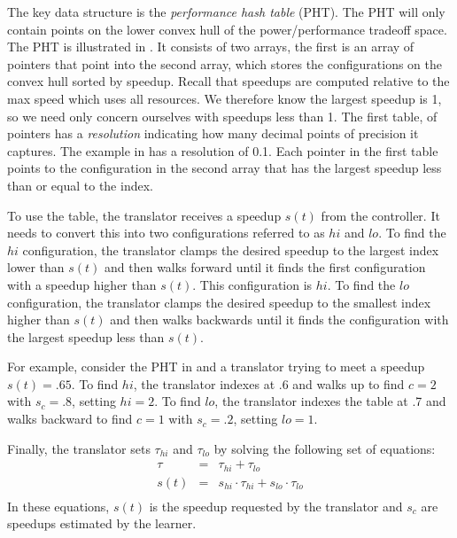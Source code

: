 The key data structure is the \emph{performance hash table} (PHT).
The PHT will only contain points on the lower convex hull of the
power/performance tradeoff space.  The PHT is illustrated in
.  It consists of two arrays, the first is an array of
pointers that point into the second array, which stores the
configurations on the convex hull sorted by speedup.  Recall that
speedups are computed relative to the max speed which uses all
resources.  We therefore know the largest speedup is 1, so we need
only concern ourselves with speedups less than 1.  The first table, of
pointers has a \emph{resolution} indicating how many decimal points of
precision it captures.  The example in  has a resolution
of 0.1.  Each pointer in the first table points to the configuration
in the second array that has the largest speedup less than or equal to
the index.

To use the table, the translator receives a speedup $s(t)$ from the
controller.  It needs to convert this into two configurations referred
to as $hi$ and $lo$.  To find the $hi$ configuration, the translator
clamps the desired speedup to the largest index lower than $s(t)$ and
then walks forward until it finds the first configuration with a
speedup higher than $s(t)$.  This configuration is $hi$.  To find the
$lo$ configuration, the translator clamps the desired speedup to the
smallest index higher than $s(t)$ and then walks backwards until it
finds the configuration with the largest speedup less than $s(t)$.

For example, consider the PHT in  and a translator trying
to meet a speedup $s(t) = .65$.  To find $hi$, the translator indexes
at .6 and walks up to find $c=2$ with $s_c=.8$, setting $hi = 2$.  To
find $lo$, the translator indexes the table at .7 and walks backward
to find $c=1$ with $s_c=.2$, setting $lo = 1$.

Finally, the translator sets $\tau_{hi}$ and $\tau_{lo}$ by solving the
following set of equations:
\begin{eqnarray}
  \tau &=& \tau_{hi} + \tau_{lo}    \label{eqn:s1} \\
  s(t) &=& s_{hi} \cdot \tau_{hi} + s_{lo} \cdot \tau_{lo} \label{eqn:s2} \\
\end{eqnarray}
In these equations, $s(t)$ is the speedup requested by the translator
and $s_c$ are speedups estimated by the learner. 


